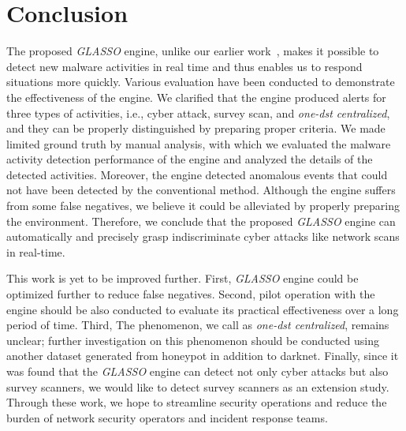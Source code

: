 \documentclass[conference]{IEEEtran}
\begin{document}



\section{Conclusion}

The proposed {\it GLASSO} engine, unlike our earlier work~\cite{Han}, makes it possible to detect new malware activities in real time and thus enables us to respond situations more quickly.
Various evaluation have been conducted to demonstrate the effectiveness of the engine.
We clarified that the engine produced alerts for three types of activities, i.e., cyber attack, survey scan, and {\it one-dst centralized}, and they can be properly distinguished by preparing proper criteria.
We made limited ground truth by manual analysis, with which we evaluated the malware activity detection performance of the engine and analyzed the details of the detected activities.
Moreover, the engine detected anomalous events that could not have been detected by the conventional method.
Although the engine suffers from some false negatives, we believe it could be alleviated by properly preparing the environment.
Therefore, we conclude that the proposed {\it GLASSO} engine can automatically and precisely grasp indiscriminate cyber attacks like network scans in real-time.

This work is yet to be improved further.
First, {\it GLASSO} engine could be optimized further to reduce false negatives.
Second, pilot operation with the engine should be also conducted to evaluate its practical effectiveness over a long period of time.
Third, The phenomenon, we call as {\it one-dst centralized}, remains unclear; further investigation on this phenomenon should be conducted using another dataset generated from honeypot in addition to darknet.
Finally, since it was found that the {\it GLASSO} engine can detect not only cyber attacks but also survey scanners, we would like to detect survey scanners as an extension study.
Through these work, we hope to streamline security operations and reduce the burden of network security operators and incident response teams.
\end{document}
